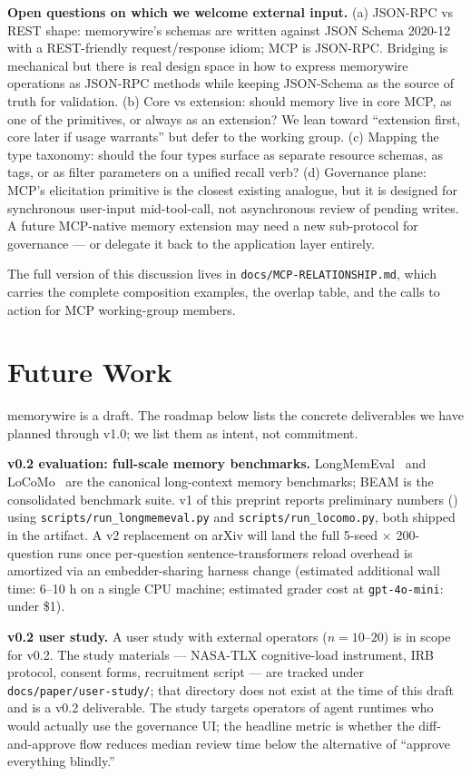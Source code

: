\documentclass[11pt,letterpaper,twocolumn]{article}
\begin{document}
\textbf{Open questions on which we welcome external input.} (a) JSON-RPC vs REST shape: memorywire's schemas are written against JSON Schema 2020-12 with a REST-friendly request/response idiom; MCP is JSON-RPC. Bridging is mechanical but there is real design space in how to express memorywire operations as JSON-RPC methods while keeping JSON-Schema as the source of truth for validation. (b) Core vs extension: should memory live in core MCP, as one of the primitives, or always as an extension? We lean toward ``extension first, core later if usage warrants'' but defer to the working group. (c) Mapping the type taxonomy: should the four types surface as separate resource schemas, as tags, or as filter parameters on a unified recall verb? (d) Governance plane: MCP's elicitation primitive is the closest existing analogue, but it is designed for synchronous user-input mid-tool-call, not asynchronous review of pending writes. A future MCP-native memory extension may need a new sub-protocol for governance --- or delegate it back to the application layer entirely.

The full version of this discussion lives in \texttt{docs/MCP-RELATIONSHIP.md}, which carries the complete composition examples, the overlap table, and the calls to action for MCP working-group members.

\section{Future Work}
\label{sec:future}

memorywire is a draft. The roadmap below lists the concrete deliverables we have planned through v1.0; we list them as intent, not commitment.

\textbf{v0.2 evaluation: full-scale memory benchmarks.} LongMemEval~\cite{wu2024longmemeval} and LoCoMo~\cite{maharana2024locomo} are the canonical long-context memory benchmarks; BEAM is the consolidated benchmark suite. v1 of this preprint reports preliminary numbers () using \texttt{scripts/run\_longmemeval.py} and \texttt{scripts/run\_locomo.py}, both shipped in the artifact. A v2 replacement on arXiv will land the full 5-seed $\times$ 200-question runs once per-question sentence-transformers reload overhead is amortized via an embedder-sharing harness change (estimated additional wall time: 6--10 h on a single CPU machine; estimated grader cost at \texttt{gpt-4o-mini}: under \$1).

\textbf{v0.2 user study.} A user study with external operators ($n=10$--$20$) is in scope for v0.2. The study materials --- NASA-TLX cognitive-load instrument, IRB protocol, consent forms, recruitment script --- are tracked under \texttt{docs/paper/user-study/}; that directory does not exist at the time of this draft and is a v0.2 deliverable. The study targets operators of agent runtimes who would actually use the governance UI; the headline metric is whether the diff-and-approve flow reduces median review time below the alternative of ``approve everything blindly.''
\end{document}

